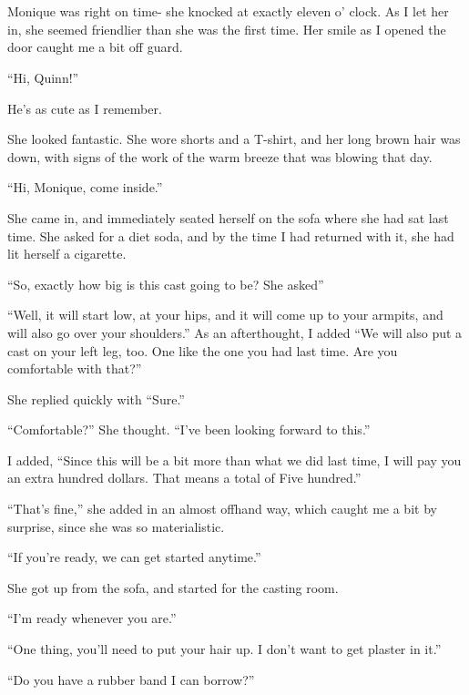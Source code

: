 \chapter{}
Monique was right on time- she knocked at exactly eleven o' clock. As I let her in, she
seemed friendlier than she was the first time. Her smile as I opened the door caught me a bit
off guard.

``Hi, Quinn!''

\begin{thought}
He's as cute as I remember.
\end{thought}

She looked fantastic. She wore shorts and a T-shirt, and her long brown hair was down, with
signs of the work of the warm breeze that was blowing that day.

``Hi, Monique, come inside.''

She came in, and immediately seated herself on the sofa where she had sat last time. She
asked for a diet soda, and by the time I had returned with it, she had lit herself a cigarette.

``So, exactly how big is this cast going to be? She asked''

``Well, it will start low, at your hips, and it will come up to your armpits, and will also
go over your shoulders.'' As an afterthought, I added ``We will also put a cast on your left
leg,
too. One like the one you had last time. Are you comfortable with that?''

She replied quickly with ``Sure.''

\begin{thought}
``Comfortable?'' She thought. ``I've been looking forward to this.''
\end{thought}

I added, ``Since this will be a bit more than what we did last time, I will pay you an extra
hundred dollars. That means a total of Five hundred.''

``That's fine,'' she added in an almost offhand way, which caught me a bit by surprise, since
she was so materialistic.

``If you're ready, we can get started anytime.''

She got up from the sofa, and started for the casting room.

``I'm ready whenever you are.''

``One thing, you'll need to put your hair up. I don't want to get plaster in it.''

``Do you have a rubber band I can borrow?''

